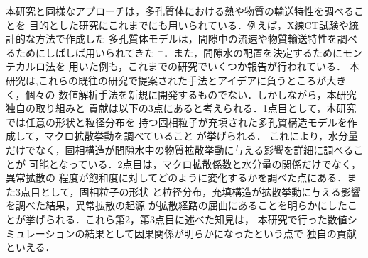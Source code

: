 本研究と同様なアプローチは，多孔質体における熱や物質の輸送特性を調べることを
目的とした研究にこれまでにも用いられている．例えば，X線CT試験や統計的な方法で作成した
多孔質体モデルは，間隙中の流速や物質輸送特性を調べるためにしばしば用いられてきた
\cite{Liang}$^-$\cite{Narsilio}．また，間隙水の配置を決定するためにモンテカルロ法を
用いた例も，これまでの研究でいくつか報告が行われている\cite{Berkowitz,MC}．
本研究は,これらの既往の研究で提案された手法とアイデアに負うところが大きく，個々の
数値解析手法を新規に開発するものでない．しかしながら，本研究独自の取り組みと
貢献は以下の3点にあると考えられる．1点目として，本研究では任意の形状と粒径分布を
持つ固相粒子が充填された多孔質構造モデルを作成して，マクロ拡散挙動を調べていること
が挙げられる．
これにより，水分量だけでなく，固相構造が間隙水中の物質拡散挙動に与える影響を詳細に調べることが
可能となっている．2点目は，マクロ拡散係数と水分量の関係だけでなく，異常拡散の
程度が飽和度に対してどのように変化するかを調べた点にある．また3点目として，固相粒子の形状
と粒径分布，充填構造が拡散挙動に与える影響を調べた結果，異常拡散の起源
が拡散経路の屈曲にあることを明らかにしたことが挙げられる．これら第2，第3点目に述べた知見は，
本研究で行った数値シミュレーションの結果として因果関係が明らかになったという点で
独自の貢献といえる．
